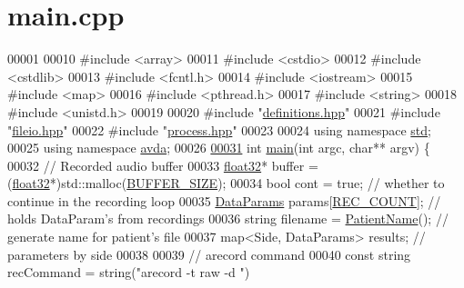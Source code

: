 \hypertarget{main_8cpp_source}{\section{main.\+cpp}
\label{main_8cpp_source}
}

\begin{DoxyCode}
00001 
00010 \textcolor{preprocessor}{#include <array>}
00011 \textcolor{preprocessor}{#include <cstdio>}
00012 \textcolor{preprocessor}{#include <cstdlib>}
00013 \textcolor{preprocessor}{#include <fcntl.h>}
00014 \textcolor{preprocessor}{#include <iostream>}
00015 \textcolor{preprocessor}{#include <map>}
00016 \textcolor{preprocessor}{#include <pthread.h>}
00017 \textcolor{preprocessor}{#include <string>}
00018 \textcolor{preprocessor}{#include <unistd.h>}
00019 
00020 \textcolor{preprocessor}{#include "\hyperlink{definitions_8hpp}{definitions.hpp}"}
00021 \textcolor{preprocessor}{#include "\hyperlink{fileio_8hpp}{fileio.hpp}"}
00022 \textcolor{preprocessor}{#include "\hyperlink{process_8hpp}{process.hpp}"}
00023 
00024 \textcolor{keyword}{using namespace }\hyperlink{namespacestd}{std};
00025 \textcolor{keyword}{using namespace }\hyperlink{namespaceavda}{avda};
00026 
\hypertarget{main_8cpp_source_l00031}{}\hyperlink{main_8cpp_a3c04138a5bfe5d72780bb7e82a18e627}{00031} \textcolor{keywordtype}{int} \hyperlink{main_8cpp_a3c04138a5bfe5d72780bb7e82a18e627}{main}(\textcolor{keywordtype}{int} argc, \textcolor{keywordtype}{char}** argv) \{
00032     \textcolor{comment}{// Recorded audio buffer}
00033     \hyperlink{definitions_8hpp_aacdc525d6f7bddb3ae95d5c311bd06a1}{float32}* buffer = (\hyperlink{definitions_8hpp_aacdc525d6f7bddb3ae95d5c311bd06a1}{float32}*)std::malloc(\hyperlink{definitions_8hpp_aca681ed285767aaa2353bf3b42dd60ed}{BUFFER\_SIZE});
00034     \textcolor{keywordtype}{bool} cont = \textcolor{keyword}{true};  \textcolor{comment}{// whether to continue in the recording loop}
00035     \hyperlink{structDataParams}{DataParams} params[\hyperlink{definitions_8hpp_a2fd18fd694a2918f7d73eba821fd10b2}{REC\_COUNT}];  \textcolor{comment}{// holds DataParam's from recordings}
00036     \textcolor{keywordtype}{string} filename = \hyperlink{namespaceavda_ae20728e7e8ae50bf2f74849e538841ea}{PatientName}();  \textcolor{comment}{// generate name for patient's file}
00037     map<Side, DataParams> results;  \textcolor{comment}{// parameters by side}
00038 
00039     \textcolor{comment}{// arecord command}
00040     \textcolor{keyword}{const} \textcolor{keywordtype}{string} recCommand = string(\textcolor{stringliteral}{"arecord -t raw -d "})

\end{DoxyCode}
